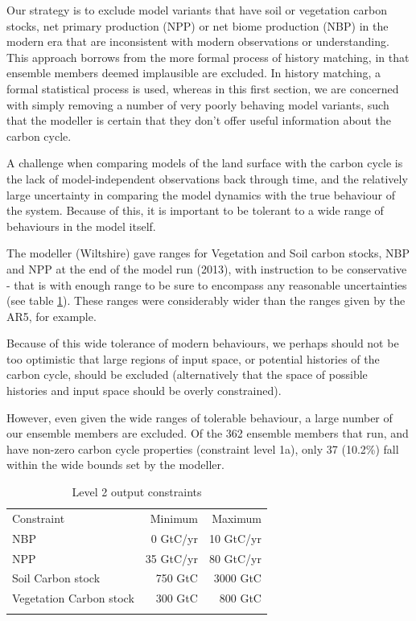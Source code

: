\documentclass[gmd, manuscript]{copernicus}
\begin{document}
Our strategy is to exclude model variants that have soil or vegetation carbon stocks, net primary production (NPP) or net biome production (NBP) in the modern era that are inconsistent with modern observations or understanding. This approach borrows from the more formal process of history matching, in that ensemble members deemed implausible are excluded. In history matching, a formal statistical process is used, whereas in this first section, we are concerned with simply removing a number of very poorly behaving model variants, such that the modeller is certain that they don't offer useful information about the carbon cycle.

A challenge when comparing models of the land surface with the carbon cycle is the lack of model-independent observations back through time, and the relatively large uncertainty in comparing the model dynamics with the true behaviour of the system. Because of this, it is important to be tolerant to a wide range of behaviours in the model itself. 

The modeller (Wiltshire) gave ranges for Vegetation and Soil carbon stocks, NBP and NPP at the end of the model run (2013), with instruction to be conservative - that is with enough range to be sure to encompass any reasonable uncertainties (see table \ref{table:level_2_constraints}). These ranges were considerably wider than the ranges given by the AR5, for example.

Because of this wide tolerance of modern behaviours, we perhaps should not be too optimistic that large regions of input space, or potential histories of the carbon cycle, should be excluded (alternatively that the space of possible histories and input space should be overly constrained).

However, even given the wide ranges of tolerable behaviour, a large number of our ensemble members are excluded. Of the 362 ensemble members that run, and have non-zero carbon cycle properties (constraint level 1a), only 37 (10.2\%) fall within the wide bounds set by the modeller.


\begin{table}[t]
\caption{Level 2 output constraints}
\label{table:level_2_constraints}
\begin{tabular}{l r r}
\tophline
Constraint & Minimum & Maximum \\ 
\middlehline
NBP & 0 GtC/yr &  10 GtC/yr\\
NPP & 35 GtC/yr & 80 GtC/yr \\
Soil Carbon stock & 750 GtC &  3000 GtC\\ 
Vegetation Carbon stock & 300 GtC & 800 GtC \\

\bottomhline
\end{tabular}
\belowtable{} %

\end{table}
\end{document}
